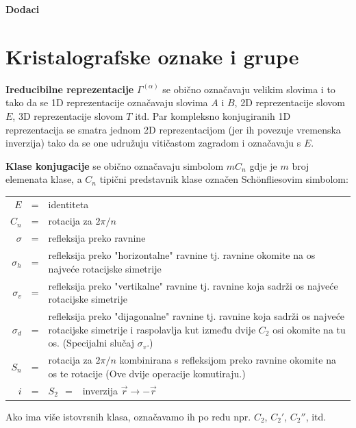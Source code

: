 
\appendix

\cleardoublepage
\vspace*{8cm}
\thispagestyle{empty}
\begin{flushright}
\Huge \bfseries Dodaci
\end{flushright}
\cleardoublepage

\chapter{Kristalografske oznake i grupe}
\label{sec:kristalografija}
\textbf{Ireducibilne reprezentacije} $\Gamma^{(\alpha)}$ se obično označavaju
velikim slovima i to tako da se 1D reprezentacije označavaju slovima
$A$ i $B$, 2D reprezentacije slovom $E$, 3D reprezentacije slovom $T$
itd. Par kompleksno konjugiranih 1D reprezentacija se smatra jednom
2D reprezentacijom (jer ih povezuje vremenska inverzija) tako da se
one udružuju vitičastom zagradom i označavaju s $E$.

\textbf{Klase konjugacije}  se obično označavaju
simbolom $mC_n$ gdje je $m$
broj elemenata klase, a $C_n$ tipični predstavnik klase označen
Sch\"{o}nfliesovim simbolom: 
\begin{center}
\begin{tabular}{rcp{10cm}}
    $E$ & = & identiteta \\  \index{Identitet!kao klasa konjugacije}
$C_n$ & = & rotacija za $2\pi/n$ \\
$\sigma$ & = & refleksija preko ravnine \\
$\sigma_{h}$ & = & refleksija preko "horizontalne" ravnine tj. ravnine
  okomite na os najveće rotacijske simetrije \\
$\sigma_{v}$ & = & refleksija preko "vertikalne" ravnine tj. ravnine
  koja sadrži os najveće rotacijske simetrije \\
$\sigma_{d}$ & = & refleksija preko "dijagonalne" ravnine tj. ravnine
  koja sadrži os najveće rotacijske simetrije i raspolavlja kut između
  dvije $C_2$ osi okomite na tu os. (Specijalni slučaj $\sigma_{v}$.) \\
$S_n$  & = & rotacija za $2\pi/n$ kombinirana s refleksijom preko ravnine
   okomite na os te rotacije (Ove dvije operacije komutiraju.) \\
$i$ & = &  $S_2 \;\, = \;\,$  inverzija $\vec{r} \to -\vec{r}$
\end{tabular}
\end{center}
Ako ima više istovrsnih klasa, označavamo ih po redu npr.
$C_{2}$, $C_{2}'$, $C_{2}''$, itd.


